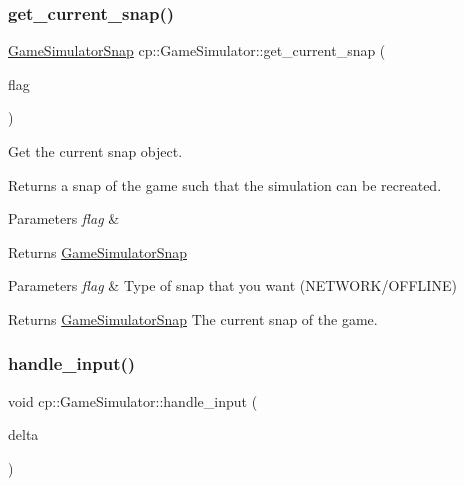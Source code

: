 \subsubsection{\texorpdfstring{get\+\_\+current\+\_\+snap()}{get\_current\_snap()}}
{\footnotesize\ttfamily \hyperlink{classcp_1_1_game_simulator_snap}{Game\+Simulator\+Snap} cp\+::\+Game\+Simulator\+::get\+\_\+current\+\_\+snap (\begin{DoxyParamCaption}\item[{Snap\+Flag}]{flag }\end{DoxyParamCaption})}



Get the current snap object. 

Returns a snap of the game such that the simulation can be recreated.


\begin{DoxyParams}{Parameters}
{\em flag} & \\
\hline
\end{DoxyParams}
\begin{DoxyReturn}{Returns}
\hyperlink{classcp_1_1_game_simulator_snap}{Game\+Simulator\+Snap}
\end{DoxyReturn}

\begin{DoxyParams}{Parameters}
{\em flag} & Type of snap that you want (N\+E\+T\+W\+O\+R\+K/\+O\+F\+F\+L\+I\+NE) \\
\hline
\end{DoxyParams}
\begin{DoxyReturn}{Returns}
\hyperlink{classcp_1_1_game_simulator_snap}{Game\+Simulator\+Snap} The current snap of the game. 
\end{DoxyReturn}
\mbox{\label{classcp_1_1_game_simulator_ab41fde16054aafe338df7e4d5590eeae}} 
\subsubsection{\texorpdfstring{handle\+\_\+input()}{handle\_input()}}
{\footnotesize\ttfamily void cp\+::\+Game\+Simulator\+::handle\+\_\+input (\begin{DoxyParamCaption}\item[{float}]{delta }\end{DoxyParamCaption})}



